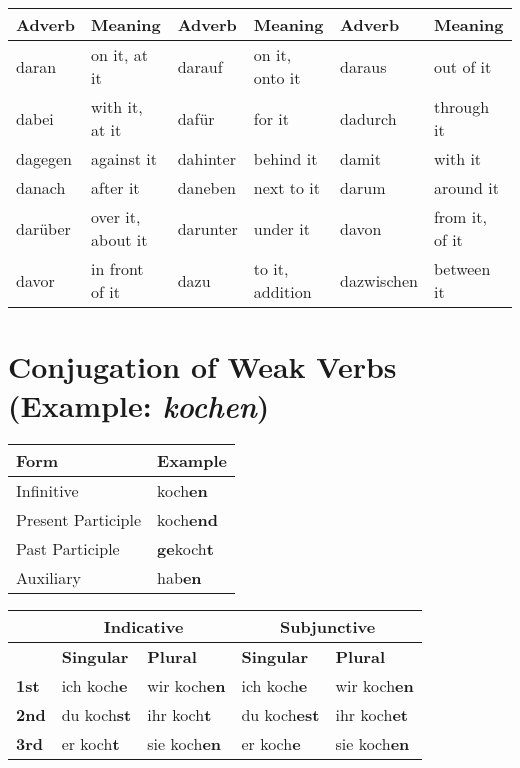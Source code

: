 \documentclass[a4paper,20pt]{article}
\newcommand{\grammarending}[1]{\textbf{\textcolor{endingcolor}{#1}}}
\begin{document}
\begin{center}
\begin{tabular}{|l|>{\columncolor{lightgray}}l|l|>{\columncolor{lightgray}}l|l|>{\columncolor{lightgray}}l|}
\hline
\textbf{Adverb} & \textbf{Meaning} & \textbf{Adverb} & \textbf{Meaning} & \textbf{Adverb} & \textbf{Meaning} \\
\hline
daran & on it, at it & darauf & on it, onto it & daraus & out of it \\
dabei & with it, at it & dafür & for it & dadurch & through it \\
dagegen & against it & dahinter & behind it & damit & with it \\
danach & after it & daneben & next to it & darum & around it \\
darüber & over it, about it & darunter & under it & davon & from it, of it \\
davor & in front of it & dazu & to it, addition & dazwischen & between it \\
\hline
\end{tabular}
\end{center}


\newpage
\section{Conjugation of Weak Verbs (Example: \textit{kochen})}

\small

\noindent

\begin{tabular}{|l|l|}
\hline
\rowcolor{lightgray}
\textbf{Form} & \textbf{Example} \\
\hline
Infinitive & koch\grammarending{en} \\
\hline
Present Participle & koch\grammarending{end} \\
\hline
Past Participle & \grammarending{ge}koch\grammarending{t} \\
\hline
Auxiliary & hab\grammarending{en} \\
\hline
\end{tabular}

\begin{tabular}{|l|l|l|l|l|}
\hline
\rowcolor{lightgray}
& \multicolumn{2}{c|}{\textbf{Indicative}} & \multicolumn{2}{c|}{\textbf{Subjunctive}} \\
\hline
\rowcolor{lightgray}
& \textbf{Singular} & \textbf{Plural} & \textbf{Singular} & \textbf{Plural} \\
\hline
\textbf{1st} & ich koch\grammarending{e} & wir koch\grammarending{en} & ich koch\grammarending{e} & wir koch\grammarending{en} \\
\hline
\textbf{2nd} & du koch\grammarending{st} & ihr koch\grammarending{t} & du koch\grammarending{est} & ihr koch\grammarending{et} \\
\hline
\textbf{3rd} & er koch\grammarending{t} & sie koch\grammarending{en} & er koch\grammarending{e} & sie koch\grammarending{en} \\
\hline
\end{tabular}
\end{document}
